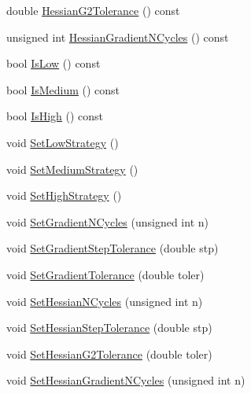 \begin{DoxyCompactItemize}
\item 
double \mbox{\hyperlink{classROOT_1_1Minuit2_1_1MnStrategy_a0b111848a04cb9b95615402c78709846}{Hessian\+G2\+Tolerance}} () const
\item 
unsigned int \mbox{\hyperlink{classROOT_1_1Minuit2_1_1MnStrategy_a49354e374820b73f7e8b6701d7e07922}{Hessian\+Gradient\+N\+Cycles}} () const
\item 
bool \mbox{\hyperlink{classROOT_1_1Minuit2_1_1MnStrategy_a5b777bca218ea524454f304e67fbbf83}{Is\+Low}} () const
\item 
bool \mbox{\hyperlink{classROOT_1_1Minuit2_1_1MnStrategy_a83e9fa3f54c51bbf7f54de2096d75cfe}{Is\+Medium}} () const
\item 
bool \mbox{\hyperlink{classROOT_1_1Minuit2_1_1MnStrategy_a49f91ddb7327a651bc0580e644acc8fb}{Is\+High}} () const
\item 
void \mbox{\hyperlink{classROOT_1_1Minuit2_1_1MnStrategy_a24671e2ae8a1224583adfcb3fb73ad55}{Set\+Low\+Strategy}} ()
\item 
void \mbox{\hyperlink{classROOT_1_1Minuit2_1_1MnStrategy_ae813d1aedcf6fa8f2bfb09a501a783f4}{Set\+Medium\+Strategy}} ()
\item 
void \mbox{\hyperlink{classROOT_1_1Minuit2_1_1MnStrategy_a92e5deb2087eec6e0d7db5d5789f3a06}{Set\+High\+Strategy}} ()
\item 
void \mbox{\hyperlink{classROOT_1_1Minuit2_1_1MnStrategy_abf74d8c002c658339f15df4b56aa4fdb}{Set\+Gradient\+N\+Cycles}} (unsigned int n)
\item 
void \mbox{\hyperlink{classROOT_1_1Minuit2_1_1MnStrategy_ad6051100db67df070103c2478740ee8f}{Set\+Gradient\+Step\+Tolerance}} (double stp)
\item 
void \mbox{\hyperlink{classROOT_1_1Minuit2_1_1MnStrategy_aa7e6c4626962cd81e05821955ff562aa}{Set\+Gradient\+Tolerance}} (double toler)
\item 
void \mbox{\hyperlink{classROOT_1_1Minuit2_1_1MnStrategy_a7d97d197e18c686e2cdb826ea514de28}{Set\+Hessian\+N\+Cycles}} (unsigned int n)
\item 
void \mbox{\hyperlink{classROOT_1_1Minuit2_1_1MnStrategy_a8711f7c9983983c83fd5d192bc9304f7}{Set\+Hessian\+Step\+Tolerance}} (double stp)
\item 
void \mbox{\hyperlink{classROOT_1_1Minuit2_1_1MnStrategy_aed3f2b229af4c5a4091507830f4275e0}{Set\+Hessian\+G2\+Tolerance}} (double toler)
\item 
void \mbox{\hyperlink{classROOT_1_1Minuit2_1_1MnStrategy_ad8984d94901eaf8cad19fe49647449bf}{Set\+Hessian\+Gradient\+N\+Cycles}} (unsigned int n)
\end{DoxyCompactItemize}


